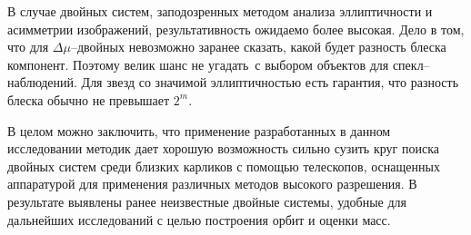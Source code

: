 В случае двойных систем, заподозренных методом анализа эллиптичности и асимметрии изображений, результативность ожидаемо более высокая. Дело в том, что для $\Delta\mu$--двойных невозможно заранее сказать, какой будет разность блеска компонент. Поэтому велик шанс \glqq не угадать\grqq\ с выбором объектов для спекл--наблюдений. Для звезд со значимой эллиптичностью есть гарантия, что разность блеска обычно не превышает $2^m$. 

В целом можно заключить, что применение разработанных в данном исследовании методик дает хорошую возможность сильно сузить круг поиска двойных систем среди близких карликов с помощью телескопов, оснащенных аппаратурой для применения различных методов высокого разрешения. В результате выявлены ранее неизвестные двойные системы, удобные для дальнейших исследований с целью построения орбит и оценки масс.
